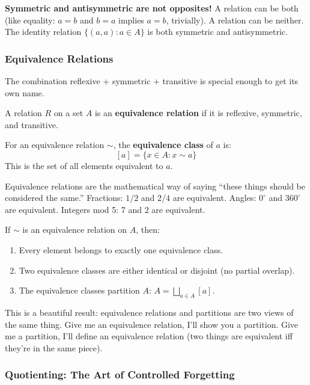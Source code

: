 \begin{commonmistake}
\textbf{Symmetric and antisymmetric are not opposites!} A relation can be both (like equality: $a = b$ and $b = a$ implies $a = b$, trivially). A relation can be neither. The identity relation $\{(a,a) : a \in A\}$ is both symmetric and antisymmetric.
\end{commonmistake}

\subsubsection*{Equivalence Relations}

The combination reflexive + symmetric + transitive is special enough to get its own name.

\begin{definition}
A relation $R$ on a set $A$ is an \textbf{equivalence relation} if it is reflexive, symmetric, and transitive.

For an equivalence relation $\sim$, the \textbf{equivalence class} of $a$ is:
\[
[a] = \{x \in A : x \sim a\}
\]
This is the set of all elements equivalent to $a$.
\end{definition}

Equivalence relations are the mathematical way of saying ``these things should be considered the same.'' Fractions: $1/2$ and $2/4$ are equivalent. Angles: $0^\circ$ and $360^\circ$ are equivalent. Integers mod 5: 7 and 2 are equivalent.

\begin{theorem}
If $\sim$ is an equivalence relation on $A$, then:
\begin{enumerate}
  \item Every element belongs to exactly one equivalence class.
  \item Two equivalence classes are either identical or disjoint (no partial overlap).
  \item The equivalence classes partition $A$: $A = \bigsqcup_{a \in A} [a]$.
\end{enumerate}
\end{theorem}

This is a beautiful result: equivalence relations and partitions are two views of the same thing. Give me an equivalence relation, I'll show you a partition. Give me a partition, I'll define an equivalence relation (two things are equivalent iff they're in the same piece).

\subsubsection*{Quotienting: The Art of Controlled Forgetting}

